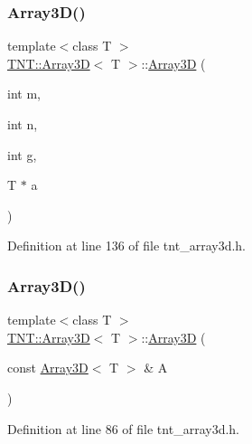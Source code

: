 \subsubsection{\texorpdfstring{Array3\+D()}{Array3D()}\hspace{0.1cm}{\footnotesize\ttfamily [4/5]}}
{\footnotesize\ttfamily template$<$class T $>$ \\
\hyperlink{classTNT_1_1Array3D}{T\+N\+T\+::\+Array3D}$<$ T $>$\+::\hyperlink{classTNT_1_1Array3D}{Array3D} (\begin{DoxyParamCaption}\item[{int}]{m,  }\item[{int}]{n,  }\item[{int}]{g,  }\item[{T $\ast$}]{a }\end{DoxyParamCaption})}



Definition at line 136 of file tnt\+\_\+array3d.\+h.

\mbox{\label{classTNT_1_1Array3D_ae137326853df4e4cdcc52afff3f5d85a}} 
\subsubsection{\texorpdfstring{Array3\+D()}{Array3D()}\hspace{0.1cm}{\footnotesize\ttfamily [5/5]}}
{\footnotesize\ttfamily template$<$class T $>$ \\
\hyperlink{classTNT_1_1Array3D}{T\+N\+T\+::\+Array3D}$<$ T $>$\+::\hyperlink{classTNT_1_1Array3D}{Array3D} (\begin{DoxyParamCaption}\item[{const \hyperlink{classTNT_1_1Array3D}{Array3D}$<$ T $>$ \&}]{A }\end{DoxyParamCaption})\hspace{0.3cm}{\ttfamily [inline]}}



Definition at line 86 of file tnt\+\_\+array3d.\+h.

\mbox{\label{classTNT_1_1Array3D_af22e1bc22155dc84168ae00f5f26258b}} 
